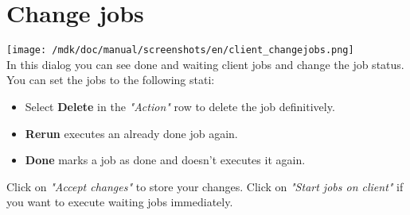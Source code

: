 \section{Change jobs}
\texttt{[image: /mdk/doc/manual/screenshots/en/client\_changejobs.png]} \\
In this dialog you can see done and waiting client jobs and change the job status. You can set the jobs to the following stati:\\
\begin{itemize}
	\item Select \textbf{Delete} in the \textit{"Action"} row to delete the job definitively.\\
	\item \textbf{Rerun} executes an already done job again.\\
	\item \textbf{Done} marks a job as done and doesn't executes it again.\\
\end{itemize}
Click on \textit{"Accept changes"} to store your changes. Click on \textit{"Start jobs on client"} if you want to execute waiting jobs immediately.\\
